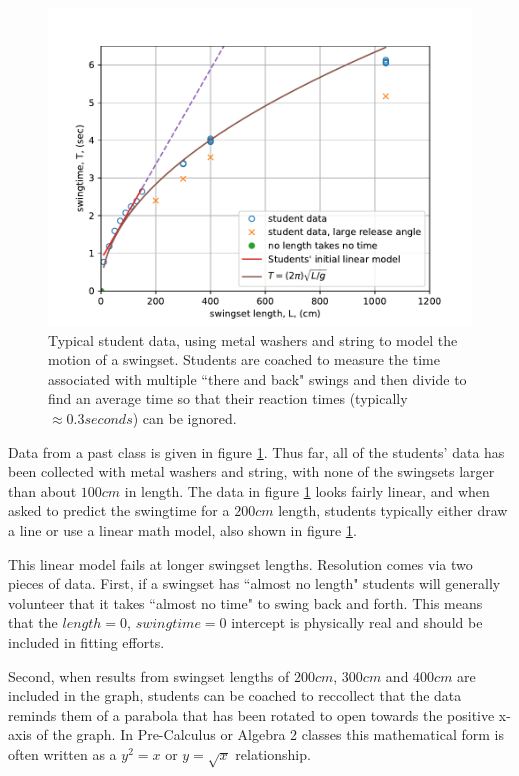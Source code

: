 \documentclass[12pt]{iopart}
\begin{document}
\begin{figure}[h]
\centering
	\includegraphics[width=\columnwidth]{linear_swingtime_graph.pdf}
\caption{
Typical student data, using metal washers and string to model the motion of a swingset.
        Students are coached to measure the time associated with multiple ``there and back" swings and then divide to find an average time so that their reaction times (typically $\approx0.3 seconds$) can be ignored.
        }
        \label{swingtime_graph}
\end{figure}

Data from a past class is given in figure \ref{swingtime_graph}. Thus far, all of the students' data has been collected with metal washers and string, with none of the swingsets larger than about $100cm$ in length. The data in figure \ref{swingtime_graph} looks fairly linear, and when asked  to predict the swingtime for a $200cm$ length, students typically either draw a line or use a linear math model, also shown in figure \ref{swingtime_graph}.  

This linear model fails at longer swingset lengths. Resolution comes via two pieces of data.  First, if a swingset has ``almost no length" students will generally volunteer that it takes ``almost no time" to swing back and forth.  This means that the $length=0$, $swingtime=0$ intercept is physically real and should be included in fitting efforts.  

Second, when results from swingset lengths of $200cm$, $300cm$ and $400cm$ are included in the graph, students can be coached to reccollect that the data reminds them of a parabola that has been rotated to open towards the positive x-axis of the graph.  In Pre-Calculus or Algebra 2 classes this mathematical form is often written as a $y^2=x$ or $y=\sqrt{x}$ relationship.  
\end{document}
